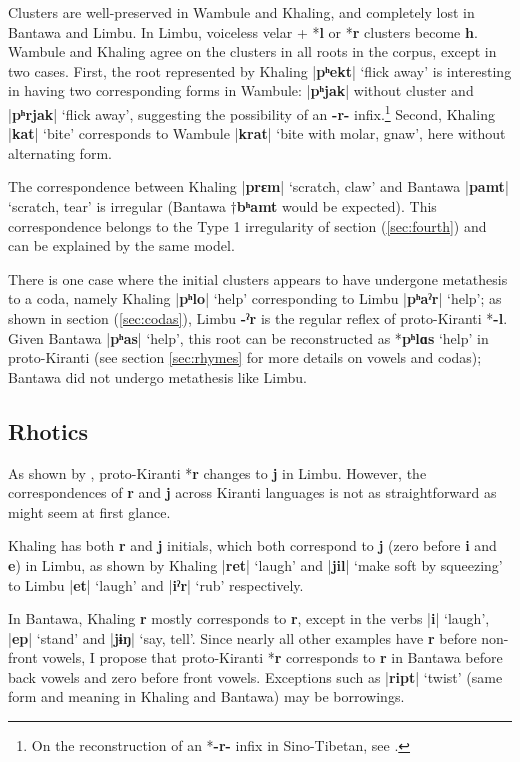 \documentclass[oneside,a4paper,11pt]{article}
\newcommand{\ipa}[1]{\textbf{{\phon\mbox{#1}}}} %
\newcommand{\dhatu}[2]{|\ipa{#1}| `#2'}
\begin{document}
Clusters are well-preserved in Wambule and Khaling, and completely lost in Bantawa and Limbu. In Limbu, voiceless velar + *\ipa{l} or *\ipa{r} clusters become \ipa{h}. Wambule and Khaling  agree on the clusters in all roots in the corpus, except in two cases. First, the root represented by Khaling \dhatu{pʰekt}{flick away} is interesting in having two corresponding forms in Wambule: |\ipa{pʰjak}| without cluster and \dhatu{pʰrjak}{flick away}, suggesting the possibility of an \ipa{-r-} infix.\footnote{On the reconstruction of an *\ipa{-r-} infix in Sino-Tibetan, see \citet[111-120]{sagart99roc}.} Second, Khaling \dhatu{kat}{bite} corresponds to Wambule  \dhatu{krat}{bite with molar, gnaw}, here without alternating form.

The correspondence between Khaling \dhatu{prɛm}{scratch, claw} and Bantawa  \dhatu{pamt}{scratch, tear} is irregular (Bantawa $\dagger$\ipa{bʰamt} would be expected). This correspondence belongs to the Type 1 irregularity of section (\ref{sec:fourth}) and can be explained by the same model.

There is one case where the initial clusters appears to have undergone metathesis to a coda, namely Khaling \dhatu{pʰlo}{help} corresponding to Limbu \dhatu{pʰaˀr}{help}; as shown in section (\ref{sec:codas}), Limbu \ipa{-ˀr} is the regular reflex of proto-Kiranti *\ipa{-l}. Given Bantawa \dhatu{pʰas}{help}, this root can be reconstructed as *\ipa{pʰlɑs} `help' in proto-Kiranti (see section \ref{sec:rhymes} for more details on vowels and codas); Bantawa did not undergo metathesis like Limbu.
 
\subsection{Rhotics} 
As shown by  \citet{driem90r}, proto-Kiranti *\ipa{r} changes to \ipa{j} in Limbu. However, the correspondences of \ipa{r} and \ipa{j} across Kiranti languages is not as straightforward as might seem at first glance.

Khaling has both \ipa{r} and \ipa{j} initials, which both correspond to \ipa{j} (zero before \ipa{i} and \ipa{e}) in Limbu, as shown by Khaling \dhatu{ret}{laugh} and  \dhatu{jil}{make soft by squeezing} to Limbu \dhatu{et}{laugh} and \dhatu{iˀr}{rub} respectively.

In Bantawa, Khaling \ipa{r} mostly corresponds to \ipa{r}, except in the verbs \dhatu{i}{laugh}, \dhatu{ep}{stand} and \dhatu{jɨŋ}{say, tell}. Since nearly all other examples have \ipa{r} before non-front vowels, I propose that proto-Kiranti *\ipa{r} corresponds to \ipa{r} in Bantawa before back vowels and zero before front vowels. Exceptions such as \dhatu{ript}{twist} (same form and meaning in Khaling and Bantawa) may be borrowings.
\end{document}
